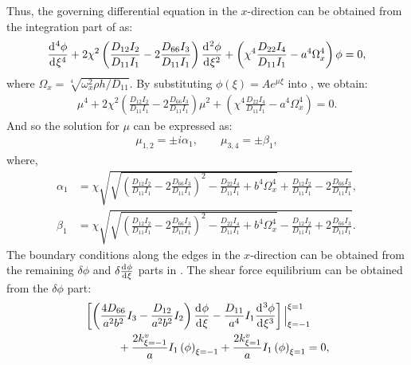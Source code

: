 \documentclass[preprint,12pt,number]{elsarticle}
\newcommand{\id}{\mathrm{d}\mkern1mu}
\begin{document}
%
Thus, the governing differential equation in the $ x $-direction can be obtained from the integration part of  as:
%
\begin{equation}\label{eq:ODEx}
\frac{\id^4 \phi}{\id \xi^4}+ 2\chi^2\left(\frac{D_{12}I_2}{D_{11}I_1}-2\frac{D_{66}I_3}{D_{11}I_1}\right)\frac{\id^2 \phi}{\id \xi^2}+\left(\chi^4\frac{D_{22}I_4}{D_{11}I_1}-a^4\Omega_x^4\right)\phi=0,
\end{equation}
%
where $\Omega_x = \sqrt[4]{\omega_x^2 \rho h / D_{11}}$.
By substituting $\phi(\xi) = A e^{\mu \xi}$ into , we obtain:
%
\begin{equation}\label{eq:ODEx2}
\begin{split}
	\mu^4 + 2\chi^2\left(\frac{D_{12}I_2}{D_{11}I_1}-2\frac{D_{66}I_3}{D_{11}I_1}\right)\mu^2 + \left(\chi^4\frac{D_{22}I_4}{D_{11}I_1}-a^4\Omega_x^4\right) = 0.
\end{split}
\end{equation}
%
And so the solution for $\mu$ can be expressed as:
%
\begin{equation}\label{eq:mu}
\begin{split}
	\mu_{1,2} = \pm\textit{i} \alpha_1, \qquad \mu_{3,4} = \pm \beta_1,
\end{split}
\end{equation}
%
where,
%
\begin{subequations}\label{eq:alphax}
\begin{align}
	\alpha_1 &= \chi \sqrt{\sqrt{\left(\frac{D_{12}I_2}{D_{11}I_1}-2\frac{D_{66}I_3}{D_{11}I_1}\right)^2 - \frac{D_{22}I_4}{D_{11}I_1} + b^4\Omega_x^4} + \frac{D_{12}I_2}{D_{11}I_1} - 2\frac{D_{66}I_3}{D_{11}I_1}},\label{eq:alphax1}\\
	\beta_1 &= \chi \sqrt{\sqrt{\left(\frac{D_{12}I_2}{D_{11}I_1}-2\frac{D_{66}I_3}{D_{11}I_1}\right)^2 - \frac{D_{22}I_4}{D_{11}I_1} + b^4\Omega_x^4} - \frac{D_{12}I_2}{D_{11}I_1} + 2\frac{D_{66}I_3}{D_{11}I_1}}.\label{eq:alphax2}
\end{align}
\end{subequations}
%
The boundary conditions along the edges in the $x$-direction can be obtained from the remaining $\delta \phi$ and $\delta \frac{\id \phi}{\id \xi}$ parts in . 
The shear force equilibrium can be obtained from the $\delta \phi$ part:
%
\begin{equation}\label{eq:inertial_forcex}
\begin{split}
	&\left[ \left( \frac{4D_{66}}{a^2b^2} I_3 - \frac{D_{12}}{a^2b^2} I_2 \right) \frac{\id \phi}{\id \xi} 
	- \frac{D_{11}}{a^4} I_1 \frac{\id^3 \phi}{\id \xi^3} \right] \Big|^{\xi=1}_{\xi=-1}\\
	&\quad\qquad+ \frac{2k^v_{\xi=-1}}{a} I_1 \left(\phi\right)_{\xi=-1}
	+ \frac{2k^v_{\xi=1}}{a} I_1 \left(\phi\right)_{\xi=1} = 0,
\end{split}
\end{equation}
\end{document}
